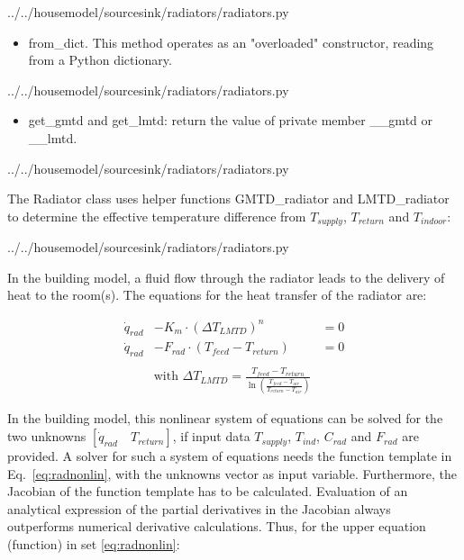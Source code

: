  
{../../housemodel/sourcesink/radiators/radiators.py}

\begin{itemize}
	\item \textsf{from\_dict}. This method operates as an "overloaded" constructor, reading from a Python \textsf{dictionary}.
\end{itemize}

 
{../../housemodel/sourcesink/radiators/radiators.py}

\begin{itemize}
	\item \textsf{get\_gmtd} and \textsf{get\_lmtd}: return the value of private member \_\_gmtd or \_\_lmtd.
\end{itemize}

 
{../../housemodel/sourcesink/radiators/radiators.py}

The Radiator class uses helper functions \textsf{GMTD\_radiator} and \textsf{LMTD\_radiator} to determine the effective temperature difference from $T_{supply}$, $T_{return}$ and $T_{indoor}$:

 
{../../housemodel/sourcesink/radiators/radiators.py}

In the building model, a fluid flow through the radiator leads to the delivery of heat to the room(s). The equations for the heat transfer of the radiator are: 

{\color{blue}
	\begin{equation}
		\label{eq:radnonlin}
		\begin{aligned}
			\dot{q}_{rad} &- K_m \cdot (\Delta T_{LMTD})^n &= 0 \\
			\dot{q}_{rad} &- F_{rad} \cdot (T_{feed} - T_{return}) &= 0 \\ \\
			&\text{with } \Delta T_{LMTD} = \frac{T_{feed} - T_{return}}{\ln\left(\frac{T_{feed} -T_{air}}{T_{return} - T_{air}}\right)}
		\end{aligned}
	\end{equation}
}

In the building model, this nonlinear system of equations can be solved for the two unknowns $[\dot{q}_{rad} \quad T_{return}]$, if input data $T_{supply}$, $ T_{ind}$, $C_{rad}$ and $F_{rad}$ are provided. A solver for such a system of equations needs the function template in Eq.~\ref{eq:radnonlin}, with the unknowns vector as input variable. Furthermore, the Jacobian of the function template has to be calculated. Evaluation of an analytical expression of the partial derivatives in the Jacobian always outperforms numerical derivative calculations. Thus, for the upper equation (function) in set \ref{eq:radnonlin}:

